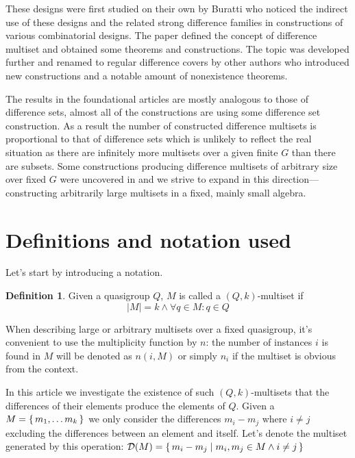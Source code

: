 \documentclass{article}
\theoremstyle{plain}
\theoremstyle{definition}
\newtheorem{definition}[theorem]{Definition}
\theoremstyle{remark}
\begin{document}
        These designs were first studied on their own by Buratti \cite{buratti1999old} who noticed the indirect use of these designs and the related strong difference families in constructions of various combinatorial designs. The paper defined the concept of difference multiset and obtained some theorems and constructions. The topic was developed further and renamed to regular difference covers by other authors \cite{arasu2005cyclic, arasu2005regular} who introduced new constructions and a notable amount of nonexistence theorems.
        
        The results in the foundational articles are mostly analogous to those of difference sets, almost all of the constructions are using some difference set construction. As a result the number of constructed difference multisets is proportional to that of difference sets which is unlikely to reflect the real situation as there are infinitely more multisets over a given finite $G$ than there are subsets. Some constructions producing difference multisets of arbitrary size over fixed $G$ were uncovered in \cite{momihara2009strong} and we strive to expand in this direction---constructing arbitrarily large multisets in a fixed, mainly small algebra.
    
	\section{Definitions and notation used}
    
        Let's start by introducing a notation.
        
		\begin{definition}
			\label{dms:def:ms}
			Given a quasigroup $Q$, $M$ is called a $(Q,k)$-multiset if
			\begin{equation}
				|M| = k \land \forall q \in M \colon q \in Q
			\end{equation}
		\end{definition}
	
		When describing large or arbitrary multisets over a fixed quasigroup, it's convenient to use the multiplicity function by $n$: the number of instances $i$ is found in $M$ will be denoted as $n(i,M)$ or simply $n_i$ if the multiset is obvious from the context.
	
		In this article we investigate the existence of such $(Q,k)$-multisets that the differences of their elements produce the elements of $Q$. Given a $M=\set{m_1,\ldots m_k}$ we only consider the differences $m_i-m_j$ where $i \neq j$ excluding the differences between an element and itself. Let's denote the multiset generated by this operation: $\mathcal D (M) = \set{m_i-m_j \mid m_i, m_j \in M \land i \neq j}$
	
\end{document}
